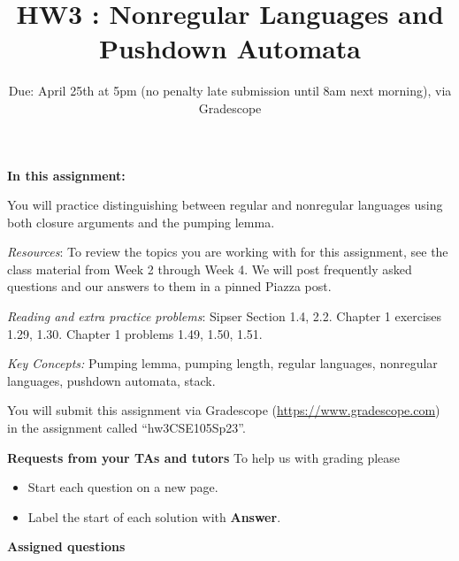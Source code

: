 \title{HW3 : Nonregular Languages and Pushdown Automata}
\date{Due: April 25th at 5pm (no penalty late submission until 8am next morning), via Gradescope}


\maketitle
\thispagestyle{fancy}

\textbf{In this assignment:}

You will practice distinguishing between regular and nonregular languages using both 
closure arguments and the pumping lemma.

\textit{Resources}: To review the topics you are working with for this assignment, 
see the class material from Week 2 through Week 4. We will post frequently asked questions 
and our answers to them in a pinned Piazza post.

\textit{Reading and extra practice problems}: Sipser Section 1.4, 2.2. Chapter 1 
exercises 1.29, 1.30. Chapter 1 problems 1.49, 1.50, 1.51.

\textit{Key Concepts:} Pumping lemma, pumping length, regular languages, nonregular languages, 
pushdown automata, stack.

\instructions

You will submit this assignment via Gradescope
(\href{https://www.gradescope.com}{https://www.gradescope.com}) 
in the assignment called ``hw3CSE105Sp23''.

\textbf{Requests from your TAs and tutors}
To help us with grading please 
\begin{itemize}
    \item Start each question on a new page.
    \item Label the start of each solution with {\bf Answer}.
\end{itemize}

\textbf{Assigned questions}

